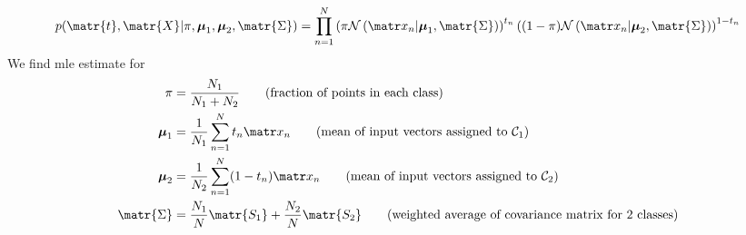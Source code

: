 \documentclass[11pt]{article}
\begin{document}
\begin{defn*}
\begin{enumerate}
        \[
            p(\matr{t}, \matr{X}| \pi, \bmu_1, \bmu_2, \matr{\Sigma}) 
            = \prod_{n=1}^N \left( \pi \normal{\bx_n | \bmu_1, \matr{\Sigma}} \right)^{t_n} \left( (1-\pi)\normal{\bx_n | \bmu_2, \matr{\Sigma}} \right)^{1-t_n}
        \]
        We find mle estimate for
        \begin{align*}
            \pi &= \frac{N_1}{N_1 + N_2} 
            \tag{fraction of points in each class} \\ 
            \bmu_1 &= \frac{1}{N_1} \sum_{n=1}^N t_n \bx_n 
            \tag{mean of input vectors assigned to $\calC_1$} \\ 
            \bmu_2 &= \frac{1}{N_2} \sum_{n=1}^N (1-t_n) \bx_n    
            \tag{mean of input vectors assigned to $\calC_2$} \\ 
            \matr{\Sigma} &= \frac{N_1}{N} \matr{S_1} + \frac{N_2}{N} \matr{S_2} \tag{weighted average of covariance matrix for 2 classes} \\ 
        \end{align*}
    \end{enumerate}
\end{defn*}


\end{document}
